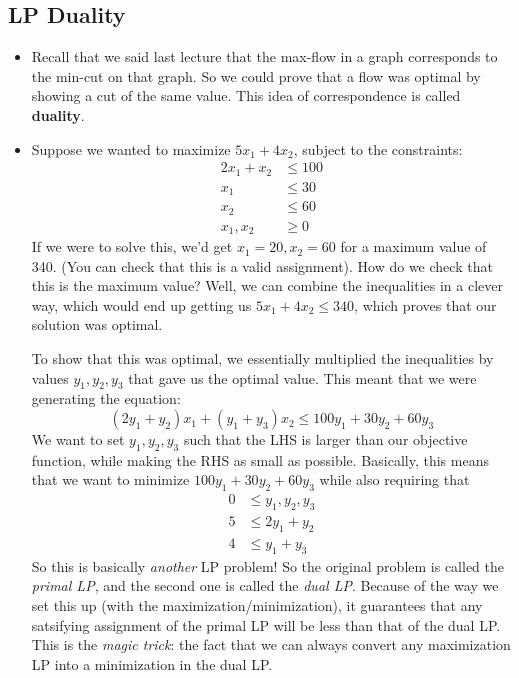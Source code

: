 \subsection{LP Duality}
\begin{itemize}
	\item Recall that we said last lecture that the max-flow in a graph corresponds to the min-cut on that 
		graph. So we could prove that a flow was optimal by showing a cut of the same value. This idea of 
		correspondence is called \textbf{duality}. 
	\item Suppose we wanted to maximize \(5x_1 + 4x_2\), subject to the constraints:
		\begin{align*}
			2x_1 + x_2 &\le 100\\
			x_1 &\le  30 \\
			x_2 &\le 60\\
			x_1, x_2 &\ge 0
		\end{align*}
		If we were to solve this, we'd get \(x_1 = 20, x_2 = 60\) for a maximum value of 340. (You can 
		check that this is a valid assignment). How do we check 
		that this is the maximum value? Well, we can combine the inequalities in a clever way, which 
		would end up getting us \(5x_1 + 4x_2 \le 340\), which proves that our solution was optimal. 

		To show that this was optimal, we essentially multiplied the inequalities by values \(y_1, y_2, y_3\) 
		that gave us the optimal value. This meant that we were generating the equation:
		\[
			(2y_1 + y_2) x_1 + (y_1 + y_3) x_2 \le 100 y_1 + 30 y_2 + 60 y_3
		\] 
		We want to set \(y_1, y_2, y_3\) such that the LHS is larger than our objective function, while 
		making the RHS as small as possible. Basically, this means that we want to minimize \(100y_1 + 
		30y_2 + 60y_3\) while also requiring that
		\begin{align*}
			0 &\le y_1, y_2, y_3\\
			5 &\le 2y_1 + y_2\\
			4 & \le  y_1 + y_3
		\end{align*}
		So this is basically \textit{another} LP problem! So the original problem is called the \textit{primal
		LP}, and the second one is called the \textit{dual LP}. Because of the way we set this up 
		(with the maximization/minimization), it guarantees that any satsifying assignment of the 
		primal LP will be less than that of the dual LP. This is the \textit{magic trick}: the fact that we can 
		always convert any maximization LP into a minimization in the dual LP. 


\end{itemize}
